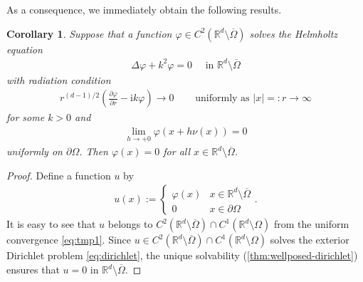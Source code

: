 \documentclass{article}
\theoremstyle{plain}
\newtheorem{cor}[thm]{Corollary}
\theoremstyle{definition}
\begin{document}
As a consequence, we immediately obtain the following results.
\begin{cor}
    Suppose that a function $\varphi\in C^2(\mathbb R^d\setminus\overline\Omega)$ solves the Helmholtz equation
    \begin{align*}
        \varDelta \varphi + k^2 \varphi  = 0 \quad\text{ in }\mathbb R^d\setminus\overline\Omega
    \end{align*}
    with radiation condition
    \begin{align*}
        r^{(d-1)/2}\left( \frac{\partial \varphi}{\partial r} - \mathrm ik\varphi\right) \to 0  \quad &\text{ uniformly as } |x|=:r\to\infty
    \end{align*}
    for some $k>0$ and 
    \begin{align}\label{eq:tmp1}
        \lim_{h\to+0} \varphi (x+h\nu(x)) = 0 
    \end{align}
    uniformly on $\partial\Omega$. Then $\varphi (x)=0$ for all $x\in \mathbb R^d\setminus\overline\Omega$.
\end{cor}
\begin{proof}
    Define a function $u$ by
    \begin{align*}
        u(x) :=
        \begin{cases}
            \varphi(x) & x\in \mathbb R^d\setminus\overline\Omega
            \\
            0 & x\in \partial\Omega
        \end{cases}
        .
    \end{align*}
    It is easy to see that $u$ belongs to $C^2(\mathbb R^d\setminus\overline\Omega) \cap C^1(\mathbb R^d\setminus\Omega)$ from the uniform convergence \cref{eq:tmp1}. Since $u\in C^2(\mathbb R^d\setminus\overline\Omega) \cap C^1(\mathbb R^d\setminus\Omega)$ solves the exterior Dirichlet problem \cref{eq:dirichlet}, the unique solvability (\cref{thm:wellposed-dirichlet}) ensures that $u=0$ in $\mathbb R^d\setminus\overline\Omega$.
\end{proof}
\end{document}
